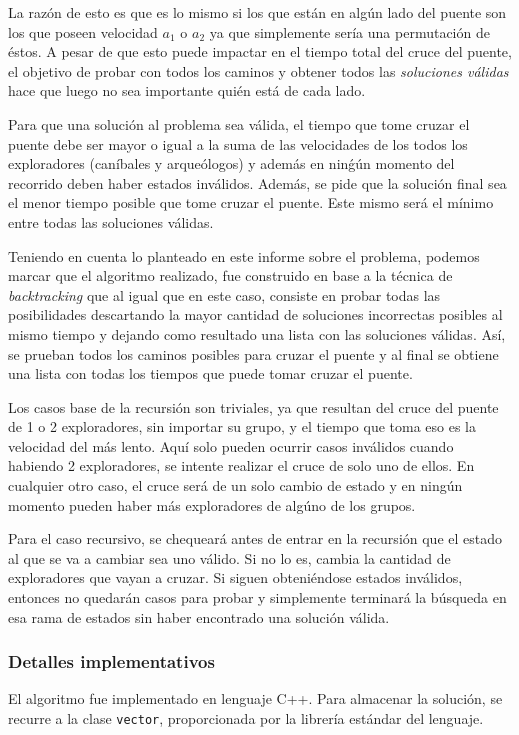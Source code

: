         La razón de esto es que es lo mismo si los que están en algún lado del puente son los que poseen velocidad $a_1$ o $a_2$ ya que simplemente sería una permutación de éstos. A pesar de que esto puede impactar en el tiempo total del cruce del puente, el objetivo de probar con todos los caminos y obtener todos las \emph{soluciones válidas} hace que luego no sea importante quién está de cada lado.

        Para que una solución al problema sea válida, el tiempo que tome cruzar el puente debe ser mayor o igual a la suma de las velocidades de los todos los exploradores (caníbales y arqueólogos) y además en ninǵún momento del recorrido deben haber estados inválidos. Además, se pide que la solución final sea el menor tiempo posible que tome cruzar el puente. Este mismo será el mínimo entre todas las soluciones válidas.

        Teniendo en cuenta lo planteado en este informe sobre el problema, podemos marcar que el algoritmo realizado, fue construido en base a la técnica de \emph{backtracking} que al igual que en este caso, consiste en probar todas las posibilidades descartando la mayor cantidad de soluciones incorrectas posibles al mismo tiempo y dejando como resultado una lista con las soluciones válidas. Así, se prueban todos los caminos posibles para cruzar el puente y al final se obtiene una lista con todas los tiempos que puede tomar cruzar el puente.

        Los casos base de la recursión son triviales, ya que resultan del cruce del puente de 1 o 2 exploradores, sin importar su grupo, y el tiempo que toma eso es la velocidad del más lento. Aquí solo pueden ocurrir casos inválidos cuando habiendo 2 exploradores, se intente realizar el cruce de solo uno de ellos. En cualquier otro caso, el cruce será de un solo cambio de estado y en ningún momento pueden haber más exploradores de algúno de los grupos.

        Para el caso recursivo, se chequeará antes de entrar en la recursión que el estado al que se va a cambiar sea uno válido. Si no lo es, cambia la cantidad de exploradores que vayan a cruzar. Si siguen obteniéndose estados inválidos, entonces no quedarán casos para probar y simplemente terminará la búsqueda en esa rama de estados sin haber encontrado una solución válida.

        \subsubsection{Detalles implementativos}
            El algoritmo fue implementado en lenguaje C++. Para almacenar la solución, se recurre a la clase \texttt{vector}, proporcionada por la librería estándar del lenguaje.

